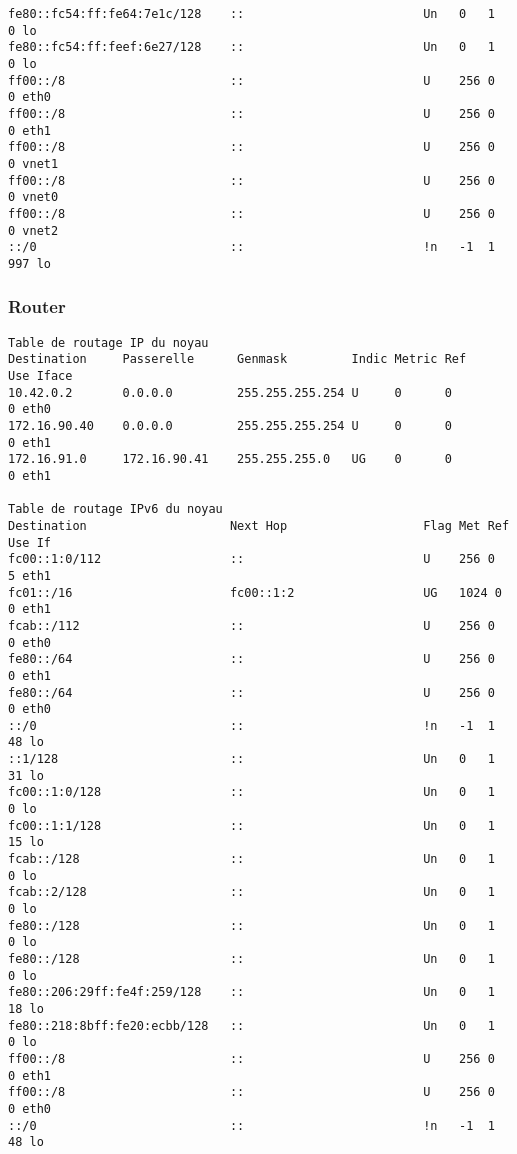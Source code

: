 \begin{verbatim}
fe80::fc54:ff:fe64:7e1c/128    ::                         Un   0   1     0 lo
fe80::fc54:ff:feef:6e27/128    ::                         Un   0   1     0 lo
ff00::/8                       ::                         U    256 0     0 eth0
ff00::/8                       ::                         U    256 0     0 eth1
ff00::/8                       ::                         U    256 0     0 vnet1
ff00::/8                       ::                         U    256 0     0 vnet0
ff00::/8                       ::                         U    256 0     0 vnet2
::/0                           ::                         !n   -1  1   997 lo
\end{verbatim}

\newpage

		\subsubsection{\label{routeRouter}Router}
		\vspace{0.3cm}

\begin{verbatim}
Table de routage IP du noyau
Destination     Passerelle      Genmask         Indic Metric Ref    Use Iface
10.42.0.2       0.0.0.0         255.255.255.254 U     0      0        0 eth0
172.16.90.40    0.0.0.0         255.255.255.254 U     0      0        0 eth1
172.16.91.0     172.16.90.41    255.255.255.0   UG    0      0        0 eth1

Table de routage IPv6 du noyau
Destination                    Next Hop                   Flag Met Ref Use If
fc00::1:0/112                  ::                         U    256 0     5 eth1
fc01::/16                      fc00::1:2                  UG   1024 0     0 eth1
fcab::/112                     ::                         U    256 0     0 eth0
fe80::/64                      ::                         U    256 0     0 eth1
fe80::/64                      ::                         U    256 0     0 eth0
::/0                           ::                         !n   -1  1    48 lo
::1/128                        ::                         Un   0   1    31 lo
fc00::1:0/128                  ::                         Un   0   1     0 lo
fc00::1:1/128                  ::                         Un   0   1    15 lo
fcab::/128                     ::                         Un   0   1     0 lo
fcab::2/128                    ::                         Un   0   1     0 lo
fe80::/128                     ::                         Un   0   1     0 lo
fe80::/128                     ::                         Un   0   1     0 lo
fe80::206:29ff:fe4f:259/128    ::                         Un   0   1    18 lo
fe80::218:8bff:fe20:ecbb/128   ::                         Un   0   1     0 lo
ff00::/8                       ::                         U    256 0     0 eth1
ff00::/8                       ::                         U    256 0     0 eth0
::/0                           ::                         !n   -1  1    48 lo
\end{verbatim}

